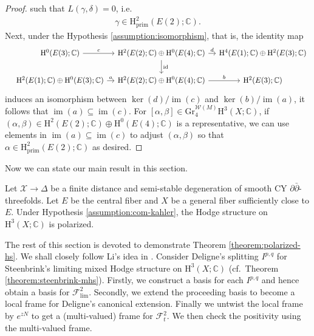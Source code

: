 \begin{proof}
such that \(L(\gamma,\delta)=0\), i.e.
\begin{eqnarray*}
\gamma\in\mathrm{H}^{2}_{\mathrm{prim}}(E(2);\mathbb{C}).
\end{eqnarray*}
Next, under the Hypothesis \ref{assumption:isomorphism}, that is, the identity map
\begin{equation*}
\begin{tikzcd}[column sep=1em]
&\mathrm{H}^{0}(E(3);\mathbb{C})\ar[r,"c"] 
&\mathrm{H}^{2}(E(2);\mathbb{C})\oplus\mathrm{H}^{0}(E(4);\mathbb{C})\ar[r,"d"]\ar[d,"\mathrm{id}"]
&\mathrm{H}^{4}(E(1);\mathbb{C})\oplus\mathrm{H}^{2}(E(3);\mathbb{C})\\
&\mathrm{H}^{2}(E(1);\mathbb{C})\oplus\mathrm{H}^{0}(E(3);\mathbb{C})\ar[r,"a"]
&\mathrm{H}^{2}(E(2);\mathbb{C})\oplus\mathrm{H}^{0}(E(4);\mathbb{C})\ar[r,"b"]
&\mathrm{H}^{2}(E(3);\mathbb{C})
\end{tikzcd}
\end{equation*}
induces an isomorphism between 
\(\operatorname{ker}(d)\slash\operatorname{im}(c)\)
and \(\operatorname{ker}(b)\slash\operatorname{im}(a)\),
it follows that \(\operatorname{im}(a)\subseteq \operatorname{im}(c)\).
For 
\([\alpha,\beta]\in\mathrm{Gr}_{4}^{\mathcal{W}(M)}\mathrm{H}^{3}(X;\mathbb{C})\), if 
\((\alpha,\beta)\in \mathrm{H}^{2}(E(2);\mathbb{C})\oplus\mathrm{H}^{0}(E(4);\mathbb{C})\)
is a representative, we can use elements in \(\operatorname{im}(a)
\subseteq\operatorname{im}(c)\)
to adjust \((\alpha,\beta)\) so that 
\(\alpha\in \mathrm{H}^{2}_{\mathrm{prim}}(E(2);\mathbb{C})\) as desired.
\end{proof}


Now we can state our main result in this section.
\begin{theorem}
\label{theorem:polarized-hs}
Let \(\mathcal{X}\to\Delta\) be a finite distance and semi-stable degeneration
of smooth CY \(\partial\bar{\partial}\)-threefolds.
Let \(E\) be the central fiber
and \(X\) be a general fiber sufficiently close to \(E\). 
Under Hypothesis \ref{assumption:com-kahler}, 
the Hodge structure on \(\mathrm{H}^{3}(X;\mathbb{C})\) is polarized.
\end{theorem}
The rest of this section is devoted to demonstrate 
Theorem \ref{theorem:polarized-hs}. We shall closely follow Li's
idea in \cite{2022-Li-polarized-hodge-structures-for-clemens-manifolds}.
Consider Deligne's splitting \(I^{p,q}\) for 
Steenbrink's limiting mixed Hodge structure 
on \(\mathrm{H}^{3}(X;\mathbb{C})\) (cf.~Theorem \ref{theorem:steenbrink-mhs}).
Firstly, we construct a basis for each \(I^{p,q}\) and hence
obtain a basis for \(\mathcal{F}_{\mathrm{lim}}^{2}\). 
Secondly, we extend the proceeding basis to become a local frame 
for Deligne's canonical extension. Finally we untwist the local frame by \(e^{zN}\)
to get a (multi-valued) frame for \(\mathcal{F}^{2}_{t}\).
We then check the positivity using the multi-valued frame.


